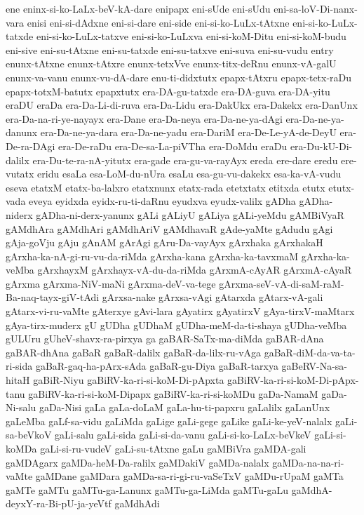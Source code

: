 {ene
eninx-si-ko-LaLx-beV-kA-dare
enipapx
eni-sUde
eni-sUdu
eni-sa-loV-Di-nanx-vara
enisi
eni-si-dAdxne
eni-si-dare
eni-side
eni-si-ko-LuLx-tAtxne
eni-si-ko-LuLx-tatxde
eni-si-ko-LuLx-tatxve
eni-si-ko-LuLxva
eni-si-koM-Ditu
eni-si-koM-budu
eni-sive
eni-su-tAtxne
eni-su-tatxde
eni-su-tatxve
eni-suva
eni-su-vudu
entry
enunx-tAtxne
enunx-tAtxre
enunx-tetxVve
enunx-titx-deRnu
enunx-vA-galU
enunx-va-vanu
enunx-vu-dA-dare
enu-ti-didxtutx
epapx-tAtxru
epapx-tetx-raDu
epapx-totxM-batutx
epapxtutx
era-DA-gu-tatxde
era-DA-guva
era-DA-yitu
eraDU
eraDa
era-Da-Li-di-ruva
era-Da-Lidu
era-DakUkx
era-Dakekx
era-DanUnx
era-Da-na-ri-ye-nayayx
era-Dane
era-Da-neya
era-Da-ne-ya-dAgi
era-Da-ne-ya-danunx
era-Da-ne-ya-dara
era-Da-ne-yadu
era-DariM
era-De-Le-yA-de-DeyU
era-De-ra-DAgi
era-De-raDu
era-De-sa-La-piVTha
era-DoMdu
eraDu
era-Du-kU-Di-dalilx
era-Du-te-ra-nA-yitutx
era-gade
era-gu-va-rayAyx
ereda
ere-dare
eredu
ere-vutatx
eridu
esaLa
esa-LoM-du-nUra
esaLu
esa-gu-vu-dakekx
esa-ka-vA-vudu
eseva
etatxM
etatx-ba-lalxro
etatxnunx
etatx-rada
etetxtatx
etitxda
etutx
etutx-vada
eveya
eyidxda
eyidx-ru-ti-daRnu
eyudxva
eyudx-valilx
gADha
gADha-niderx
gADha-ni-derx-yanunx
gALi
gALiyU
gALiya
gALi-yeMdu
gAMBiVyaR
gAMdhAra
gAMdhAri
gAMdhAriV
gAMdhavaR
gAde-yaMte
gAdudu
gAgi
gAja-goVju
gAju
gAnAM
gArAgi
gAru-Da-vayAyx
gArxhaka
gArxhakaH
gArxha-ka-nA-gi-ru-vu-da-riMda
gArxha-kana
gArxha-ka-tavxmaM
gArxha-ka-veMba
gArxhayxM
gArxhayx-vA-du-da-riMda
gArxmA-cAyAR
gArxmA-cAyaR
gArxma
gArxma-NiV-maNi
gArxma-deV-va-tege
gArxma-seV-vA-di-saM-raM-Ba-naq-tayx-giV-tAdi
gArxsa-nake
gArxsa-vAgi
gAtarxda
gAtarx-vA-gali
gAtarx-vi-ru-vaMte
gAterxye
gAvi-lara
gAyatirx
gAyatirxV
gAya-tirxV-maMtarx
gAya-tirx-muderx
gU
gUDha
gUDhaM
gUDha-meM-da-ti-shaya
gUDha-veMba
gULUru
gUheV-shavx-ra-pirxya
ga
gaBAR-SaTx-ma-diMda
gaBAR-dAna
gaBAR-dhAna
gaBaR
gaBaR-dalilx
gaBaR-da-lilx-ru-vAga
gaBaR-diM-da-va-ta-ri-sida
gaBaR-gaq-ha-pArx-sAda
gaBaR-gu-Diya
gaBaR-tarxya
gaBeRV-Na-sa-hitaH
gaBiR-Niyu
gaBiRV-ka-ri-si-koM-Di-pApxta
gaBiRV-ka-ri-si-koM-Di-pApx-tanu
gaBiRV-ka-ri-si-koM-Dipapx
gaBiRV-ka-ri-si-koMDu
gaDa-NamaM
gaDa-Ni-salu
gaDa-Nisi
gaLa
gaLa-doLaM
gaLa-hu-ti-papxru
gaLalilx
gaLanUnx
gaLeMba
gaLf-sa-vidu
gaLiMda
gaLige
gaLi-gege
gaLike
gaLi-ke-yeV-nalalx
gaLi-sa-beVkoV
gaLi-salu
gaLi-sida
gaLi-si-da-vanu
gaLi-si-ko-LaLx-beVkeV
gaLi-si-koMDa
gaLi-si-ru-vudeV
gaLi-su-tAtxne
gaLu
gaMBiVra
gaMDA-gali
gaMDAgarx
gaMDa-heM-Da-ralilx
gaMDakiV
gaMDa-nalalx
gaMDa-na-na-ri-vaMte
gaMDane
gaMDara
gaMDa-sa-ri-gi-ru-vaSeTxV
gaMDu-rUpaM
gaMTa
gaMTe
gaMTu
gaMTu-ga-Lanunx
gaMTu-ga-LiMda
gaMTu-gaLu
gaMdhA-deyxY-ra-Bi-pU-ja-yeVtf
gaMdhAdi
}

